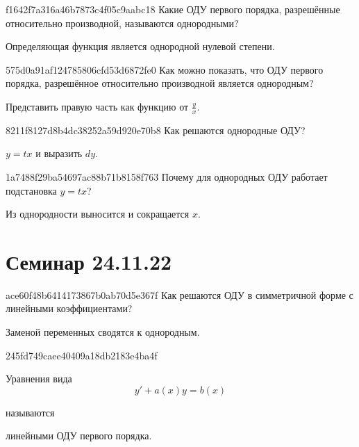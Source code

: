 \begin{note}{f1642f7a316a46b7873c4f05c9aabc18}
    Какие ОДУ первого порядка, разрешённые относительно производной, называются однородными?

    \begin{cloze}{1}
        Определяющая функция является однородной нулевой степени.
    \end{cloze}
\end{note}

\begin{note}{575d0a91af124785806cfd53d6872fe0}
    Как можно показать, что ОДУ первого порядка, разрешённое относительно производной является однородным?

    \begin{cloze}{1}
        Представить правую часть как функцию от \({ \frac{y}{x} }\).
    \end{cloze}
\end{note}

\begin{note}{8211f8127d8b4dc38252a59d920e70b8}
    Как решаются однородные ОДУ?

    \begin{cloze}{1}
        \({ y = tx }\) и выразить \({ dy }\).
    \end{cloze}
\end{note}

\begin{note}{1a7488f29ba54697ac88b71b8158f763}
    Почему для однородных ОДУ работает подстановка \({ y = tx }\)?

    \begin{cloze}{1}
        Из однородности выносится и сокращается \({ x }\).
    \end{cloze}
\end{note}

\section{Семинар 24.11.22}
\begin{note}{ace60f48b6414173867b0ab70d5e367f}
    Как решаются ОДУ в симметричной форме с линейными коэффициентами?

    \begin{cloze}{1}
        Заменой переменных сводятся к однородным.
    \end{cloze}
\end{note}

\begin{note}{245fd749caee40409a18db2183e4ba4f}
    \begin{icloze}{2}
        Уравнения вида
        \[
            y' + a(x)y = b(x)
        \]
    \end{icloze}
    называются \begin{icloze}{1}линейными ОДУ первого порядка.\end{icloze}
\end{note}


